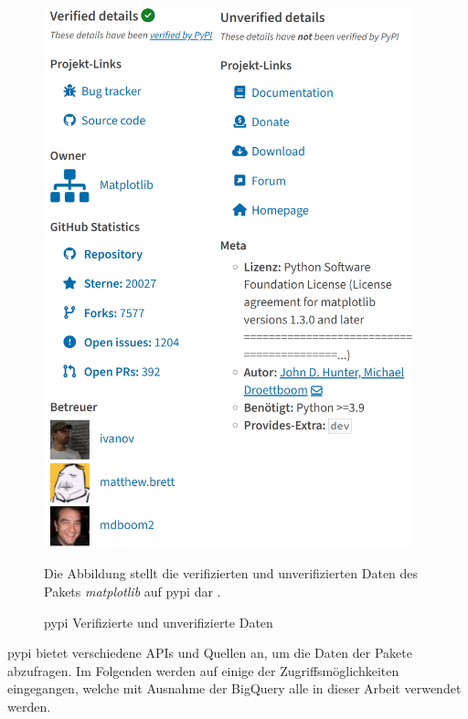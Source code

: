 \begin{figure}
    \centering
    \includegraphics[width=0.95\textwidth]{bilder/pypi.png}
    \caption{\gls{pypi} Verifizierte und unverifizierte Daten}
    \label{fig:pypi_verified_unverified_details}
    \small
    Die Abbildung stellt die verifizierten und unverifizierten Daten des Pakets \emph{matplotlib} auf \gls{pypi} dar \autocite{python_software_foundation_pypi_2024}.
\end{figure}

\gls{pypi} bietet verschiedene APIs und Quellen an, um die Daten der Pakete abzufragen.
Im Folgenden werden auf einige der Zugriffsmöglichkeiten eingegangen, welche mit Ausnahme der BigQuery alle in dieser Arbeit verwendet werden.

